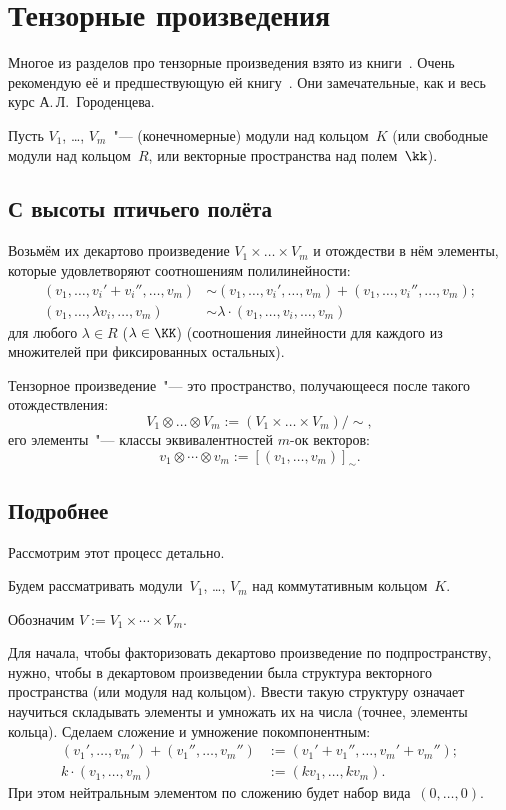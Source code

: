 \section{Тензорные произведения}

Многое из разделов про тензорные произведения взято из книги~\cite{gorodentsev03}. Очень рекомендую её и предшествующую ей книгу~\cite{gorodentsev01}. Они замечательные, как и весь курс А.\,Л.~Городенцева.

\textstars

Пусть $V_1$, \dots, $V_m$~"--- (конечномерные) модули над кольцом~$K$ (или свободные модули над кольцом~$R$, или векторные пространства над полем~$\kk$).

\subsection{С высоты птичьего полёта}

Возьмём их декартово произведение $V_1 \times \dots \times V_m$ и отождестви в нём элементы, которые удовлетворяют соотношениям полилинейности:
\[
	\begin{aligned}
		(v_1, \dots, v_i' + v_i'', \dots, v_m)
		&\sim
		(v_1, \dots, v_i', \dots, v_m)
		+
		(v_1, \dots, v_i'', \dots, v_m)
		;
		\\
		(v_1, \dots, \lambda v_i, \dots, v_m)
		&\sim
		\lambda
		\cdot
		(v_1, \dots, v_i, \dots, v_m)
	\end{aligned}
\]
для любого $\lambda \in R$ ($\lambda \in \KK$) (соотношения линейности для каждого из множителей при фиксированных остальных).

Тензорное произведение~"--- это пространство, получающееся после такого отождествления:
\[
	V_1 \otimes \dots \otimes V_m
	:=
	(V_1 \times \dots \times V_m)/\sim
	,
\]
его элементы~"--- классы эквивалентностей $m$-ок векторов:
\[
	v_1 \otimes \cdots \otimes v_m := [(v_1, \dots, v_m)]_{\sim}.
\]

\subsection{Подробнее}

Рассмотрим этот процесс детально.

Будем рассматривать модули~$V_1$, \dots, $V_m$ над коммутативным кольцом~$K$.

Обозначим $V := V_1 \times \cdots \times V_m$.

Для начала, чтобы факторизовать декартово произведение по подпространству, нужно, чтобы в декартовом произведении была структура векторного пространства (или модуля над кольцом).
Ввести такую структуру означает научиться складывать элементы и умножать их на числа (точнее, элементы кольца). Сделаем сложение и умножение покомпонентным:
\begin{align*}
	(v_1', \dots, v_m') +
	(v_1'', \dots, v_m'') &:=
	(v_1' + v_1'', \dots, v_m' + v_m'')
	;
	\\
	k \cdot (v_1, \dots, v_m) &:=
	(kv_1, \dots, kv_m)
	.
\end{align*}
При этом нейтральным элементом по сложению будет набор вида~$(0, \dots, 0)$.

